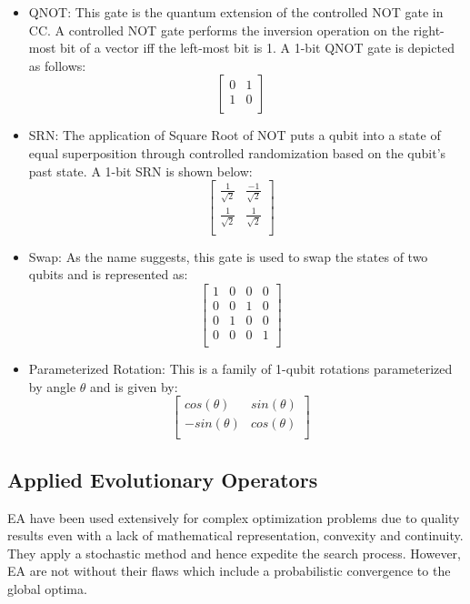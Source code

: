 \documentclass[conference]{IEEEtran}
\begin{document}
\begin{itemize}
\item QNOT: This gate is the quantum extension of the controlled NOT gate in CC. A controlled NOT gate performs the inversion operation on the right-most bit of a vector iff the left-most bit is 1. A 1-bit QNOT gate is depicted as follows:
$$
\begin{bmatrix} 
0&1\\
1&0\\
\end{bmatrix}
\quad
$$
\item SRN: The application of Square Root of NOT puts a qubit into a state of equal superposition through controlled randomization based on the qubit's past state. A 1-bit SRN is shown below:
$$
\begin{bmatrix} 
\frac{1}{\sqrt{2}}&\frac{-1}{\sqrt{2}}\\
\frac{1}{\sqrt{2}}&\frac{1}{\sqrt{2}}\\
\end{bmatrix}
\quad
$$
\item Swap: As the name suggests, this gate is used to swap the states of two qubits and is represented as:
$$
\begin{bmatrix} 
{1}&{0}&{0}&{0}\\
{0}&{0}&{1}&{0}\\
{0}&{1}&{0}&{0}\\
{0}&{0}&{0}&{1}\\
\end{bmatrix}
\quad
$$
\item Parameterized Rotation: This is a family of 1-qubit rotations parameterized by angle $\theta$ and is given by:
$$
\begin{bmatrix} 
cos(\theta)&sin(\theta)\\
-sin(\theta)&cos(\theta)\\
\end{bmatrix}
\quad
$$
\end{itemize}

\subsection{Applied Evolutionary Operators}

EA have been used extensively for complex optimization problems due to quality results even with a lack of mathematical representation, convexity and continuity. They apply a stochastic method and hence expedite the search process. However, EA are not without their flaws which include a probabilistic convergence to the global optima. 
\end{document}

